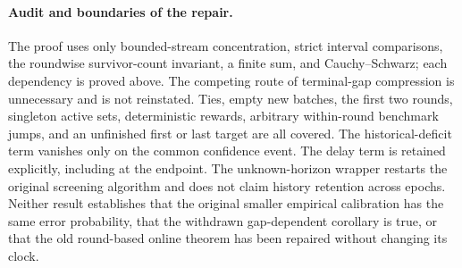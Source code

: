 \paragraph{Audit and boundaries of the repair.}
The proof uses only bounded-stream concentration, strict interval
comparisons, the roundwise survivor-count invariant, a finite sum, and
Cauchy--Schwarz; each dependency is proved above. The competing route of
terminal-gap compression is unnecessary and is not reinstated. Ties,
empty new batches, the first two rounds, singleton active sets,
deterministic rewards, arbitrary within-round benchmark jumps, and an
unfinished first or last target are all covered. The historical-deficit
term vanishes only on the common confidence event. The delay term is
retained explicitly, including at the endpoint. The unknown-horizon
wrapper restarts the original screening algorithm and does not claim
history retention across epochs. Neither result establishes that the
original smaller empirical calibration has the same error probability,
that the withdrawn gap-dependent corollary is true, or that the old
round-based online theorem has been repaired without changing its clock.
